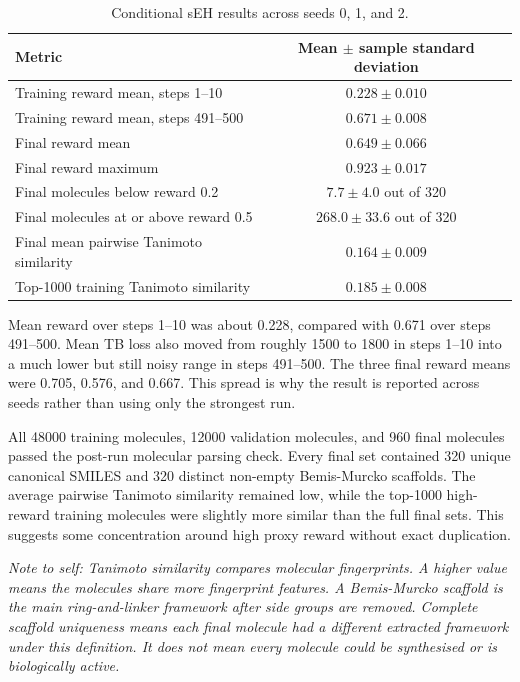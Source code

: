 \documentclass{article}
\begin{document}
\begin{table}[h]
\centering
\begin{tabular}{l c}
\hline
Metric & Mean $\pm$ sample standard deviation \\
\hline
Training reward mean, steps 1--10 & $0.228 \pm 0.010$ \\
Training reward mean, steps 491--500 & $0.671 \pm 0.008$ \\
Final reward mean & $0.649 \pm 0.066$ \\
Final reward maximum & $0.923 \pm 0.017$ \\
Final molecules below reward 0.2 & $7.7 \pm 4.0$ out of 320 \\
Final molecules at or above reward 0.5 & $268.0 \pm 33.6$ out of 320 \\
Final mean pairwise Tanimoto similarity & $0.164 \pm 0.009$ \\
Top-1000 training Tanimoto similarity & $0.185 \pm 0.008$ \\
\hline
\end{tabular}
\caption{Conditional sEH results across seeds 0, 1, and 2.}
\end{table}

Mean reward over steps 1--10 was about 0.228, compared with 0.671 over steps 491--500. Mean TB loss also moved from roughly 1500 to 1800 in steps 1--10 into a much lower but still noisy range in steps 491--500. The three final reward means were 0.705, 0.576, and 0.667. This spread is why the result is reported across seeds rather than using only the strongest run.

All 48000 training molecules, 12000 validation molecules, and 960 final molecules passed the post-run molecular parsing check. Every final set contained 320 unique canonical SMILES and 320 distinct non-empty Bemis-Murcko scaffolds. The average pairwise Tanimoto similarity remained low, while the top-1000 high-reward training molecules were slightly more similar than the full final sets. This suggests some concentration around high proxy reward without exact duplication.

\textit{Note to self: Tanimoto similarity compares molecular fingerprints. A higher value means the molecules share more fingerprint features. A Bemis-Murcko scaffold is the main ring-and-linker framework after side groups are removed. Complete scaffold uniqueness means each final molecule had a different extracted framework under this definition. It does not mean every molecule could be synthesised or is biologically active.}
\end{document}
